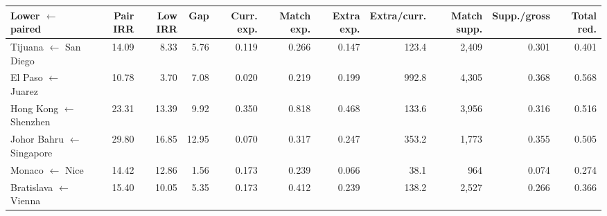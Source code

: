 {\scriptsize
\setlength{\tabcolsep}{2pt}
\renewcommand{\arraystretch}{0.95}
\begin{tabular}{@{}lrrrrrrrrrr@{}}
\toprule
Lower $\leftarrow$ paired & Pair IRR & Low IRR & Gap & Curr. exp. & Match exp. & Extra exp. & Extra/curr. & Match supp. & Supp./gross & Total red. \\
\midrule
Tijuana $\leftarrow$ San Diego & 14.09 & 8.33 & 5.76 & 0.119 & 0.266 & 0.147 & 123.4 & 2,409 & 0.301 & 0.401 \\
El Paso $\leftarrow$ Juarez & 10.78 & 3.70 & 7.08 & 0.020 & 0.219 & 0.199 & 992.8 & 4,305 & 0.368 & 0.568 \\
Hong Kong $\leftarrow$ Shenzhen & 23.31 & 13.39 & 9.92 & 0.350 & 0.818 & 0.468 & 133.6 & 3,956 & 0.316 & 0.516 \\
Johor Bahru $\leftarrow$ Singapore & 29.80 & 16.85 & 12.95 & 0.070 & 0.317 & 0.247 & 353.2 & 1,773 & 0.355 & 0.505 \\
Monaco $\leftarrow$ Nice & 14.42 & 12.86 & 1.56 & 0.173 & 0.239 & 0.066 & 38.1 & 964 & 0.074 & 0.274 \\
Bratislava $\leftarrow$ Vienna & 15.40 & 10.05 & 5.35 & 0.173 & 0.412 & 0.239 & 138.2 & 2,527 & 0.266 & 0.366 \\
\bottomrule
\end{tabular}
}
